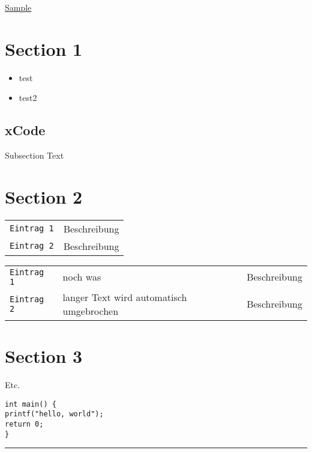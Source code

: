 \raggedright
\footnotesize
\begin{multicols}{3}	
	\setlength{\premulticols}{1pt}
	\setlength{\postmulticols}{1pt}
	\setlength{\multicolsep}{1pt}
	\setlength{\columnsep}{2pt}

\begin{center}
     \Large{\underline{Sample}} \\
\end{center}

\section{Section 1}
\begin{itemize}[leftmargin=*]
	\item test
	\item test2
\end{itemize}
\subsection{xCode}
Subsection Text

\section{Section 2}

\begin{tabular}{@{}p{\the\MyLen}%
		@{}p{\linewidth-\the\MyLen}@{}}
	\texttt{Eintrag 1} & Beschreibung \\
	\texttt{Eintrag 2} & Beschreibung \\
\end{tabular}	

\begin{tabular}{@{}p{\the\MyLen}%
		@{}p{\the\MyLenTwo}%
		@{}p{\linewidth-\the\MyLen-\the\MyLenTwo}@{}}
	\texttt{Eintrag 1} & noch was & Beschreibung \\
	\texttt{Eintrag 2} & langer Text wird automatisch umgebrochen & Beschreibung \\
\end{tabular}	
\lipsum[1-15]
\section{Section 3}
Etc.
\begin{verbatim}
int main() {
printf("hello, world");
return 0;
}
\end{verbatim}
\rule{0.3\linewidth}{0.25pt}
\scriptsize


\end{multicols}
